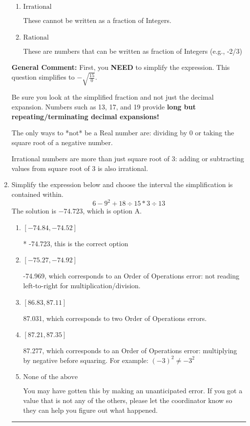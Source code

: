 \documentclass{extbook}[14pt]
\newcommand{\litem}[1]{\item #1

\rule{\textwidth}{0.4pt}}
\begin{document}
\begin{enumerate}
{\begin{enumerate}[label=\Alph*.]
These are the counting numbers with 0 (0, 1, 2, 3, ...)
\item \( \text{Irrational} \)

These cannot be written as a fraction of Integers.
\item \( \text{Rational} \)

These are numbers that can be written as fraction of Integers (e.g., -2/3)
\end{enumerate}

\textbf{General Comment:} First, you \textbf{NEED} to simplify the expression. This question simplifies to $-\sqrt{\frac{15}{0}}$. 
 
 Be sure you look at the simplified fraction and not just the decimal expansion. Numbers such as 13, 17, and 19 provide \textbf{long but repeating/terminating decimal expansions!} 
 
 The only ways to *not* be a Real number are: dividing by 0 or taking the square root of a negative number. 
 
 Irrational numbers are more than just square root of 3: adding or subtracting values from square root of 3 is also irrational.
}
\litem{
Simplify the expression below and choose the interval the simplification is contained within.
\[ 6 - 9^2 + 18 \div 15 * 3 \div 13 \]The solution is \( -74.723 \), which is option A.\begin{enumerate}[label=\Alph*.]
\item \( [-74.84, -74.52] \)

* -74.723, this is the correct option
\item \( [-75.27, -74.92] \)

 -74.969, which corresponds to an Order of Operations error: not reading left-to-right for multiplication/division.
\item \( [86.83, 87.11] \)

 87.031, which corresponds to two Order of Operations errors.
\item \( [87.21, 87.35] \)

 87.277, which corresponds to an Order of Operations error: multiplying by negative before squaring. For example: $(-3)^2 \neq -3^2$
\item \( \text{None of the above} \)

 You may have gotten this by making an unanticipated error. If you got a value that is not any of the others, please let the coordinator know so they can help you figure out what happened.
\end{enumerate}

}
\end{enumerate}
\end{document}
